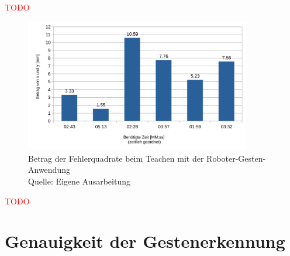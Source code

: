 \textcolor{red}{TODO}

\begin{figure}[htb]
	\centering
	\includegraphics[width=0.88\textwidth]{images/ergebnisse/Betrag_der_Fehlerquadrate}
	\caption[Betrag der Fehlerquadrate beim Teachen mit der Roboter-Gesten-Anwendung]{Betrag der Fehlerquadrate beim Teachen mit der Roboter-Gesten-Anwendung\\Quelle: Eigene Ausarbeitung}
	\label{fig:measurement_teaching_positions}
\end{figure}
\FloatBarrier

\textcolor{red}{TODO}

\section{Genauigkeit der Gestenerkennung}


